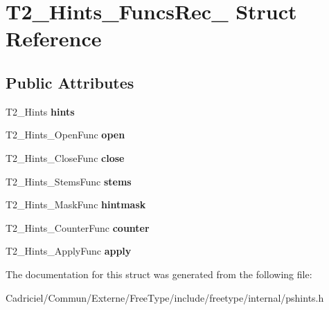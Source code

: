 \hypertarget{struct_t2___hints___funcs_rec__}{\section{T2\-\_\-\-Hints\-\_\-\-Funcs\-Rec\-\_\- Struct Reference}
\label{struct_t2___hints___funcs_rec__}
}
\subsection*{Public Attributes}
\begin{DoxyCompactItemize}
\item 
\hypertarget{struct_t2___hints___funcs_rec___af8daab694889bede5a513fbae5f86e25}{T2\-\_\-\-Hints {\bfseries hints}}\label{struct_t2___hints___funcs_rec___af8daab694889bede5a513fbae5f86e25}

\item 
\hypertarget{struct_t2___hints___funcs_rec___a1a5e0b296ee2e2ae6711b3ee35e5fcd9}{T2\-\_\-\-Hints\-\_\-\-Open\-Func {\bfseries open}}\label{struct_t2___hints___funcs_rec___a1a5e0b296ee2e2ae6711b3ee35e5fcd9}

\item 
\hypertarget{struct_t2___hints___funcs_rec___a7e50e26fd55254044bc9f2ba62574352}{T2\-\_\-\-Hints\-\_\-\-Close\-Func {\bfseries close}}\label{struct_t2___hints___funcs_rec___a7e50e26fd55254044bc9f2ba62574352}

\item 
\hypertarget{struct_t2___hints___funcs_rec___a12bfd8bae5d3df8f570fcdfb70c00139}{T2\-\_\-\-Hints\-\_\-\-Stems\-Func {\bfseries stems}}\label{struct_t2___hints___funcs_rec___a12bfd8bae5d3df8f570fcdfb70c00139}

\item 
\hypertarget{struct_t2___hints___funcs_rec___af50d0cadda7033d7dbd27a199ccfcdd4}{T2\-\_\-\-Hints\-\_\-\-Mask\-Func {\bfseries hintmask}}\label{struct_t2___hints___funcs_rec___af50d0cadda7033d7dbd27a199ccfcdd4}

\item 
\hypertarget{struct_t2___hints___funcs_rec___ad9d856a64b4a8556fc8d74bae1779e11}{T2\-\_\-\-Hints\-\_\-\-Counter\-Func {\bfseries counter}}\label{struct_t2___hints___funcs_rec___ad9d856a64b4a8556fc8d74bae1779e11}

\item 
\hypertarget{struct_t2___hints___funcs_rec___abaf12efb416bd79cf4ce72b13e6fc68f}{T2\-\_\-\-Hints\-\_\-\-Apply\-Func {\bfseries apply}}\label{struct_t2___hints___funcs_rec___abaf12efb416bd79cf4ce72b13e6fc68f}

\end{DoxyCompactItemize}


The documentation for this struct was generated from the following file\-:\begin{DoxyCompactItemize}
\item 
Cadriciel/\-Commun/\-Externe/\-Free\-Type/include/freetype/internal/pshints.\-h\end{DoxyCompactItemize}
